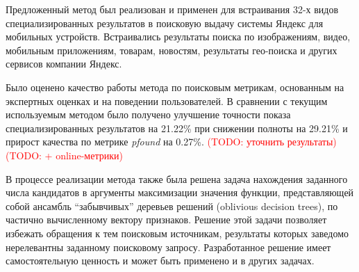 \documentclass[12pt,a4paper]{report}
\newcommand\note[1]{\textcolor{red}{(#1)}}
\newcommand\todonote[1]{\note{TODO: #1}}
\begin{document}

Предложенный метод был реализован и применен для встраивания 32-х видов специализированных результатов в поисковую выдачу системы Яндекс для мобильных устройств. Встраивались результаты поиска по изображениям, видео, мобильным приложениям, товарам, новостям, результаты гео-поиска и других сервисов компании Яндекс. 

Было оценено качество работы метода по поисковым метрикам, основанным на экспертных оценках и на поведении пользователей. В сравнении с текущим используемым методом было получено улучшение точности показа специализированных результатов на 21.22\% при снижении полноты на 29.21\% и прирост качества по метрике \textit{pfound} на 0.27\%. \todonote{уточнить результаты} \todonote{+ online-метрики}

В процессе реализации метода также была решена задача нахождения заданного числа кандидатов в аргументы максимизации значения функции, представляющей собой ансамбль ``забывчивых'' деревьев решений (oblivious decision trees), по частично вычисленному вектору признаков. Решение этой задачи позволяет избежать обращения к тем поисковым источникам, результаты которых заведомо нерелевантны заданному поисковому запросу. Разработанное решение имеет самостоятельную ценность и может быть применено и в других задачах.
\end{document}
